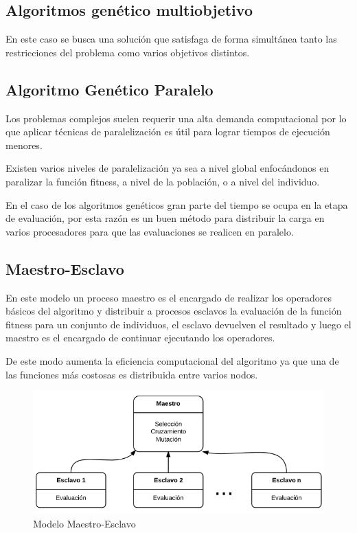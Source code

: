 \subsection{Algoritmos genético multiobjetivo}

En este caso se busca una solución que satisfaga de forma simultánea tanto las restricciones del problema como varios objetivos distintos.



\subsection{Algoritmo Genético Paralelo}
Los problemas complejos suelen requerir una alta demanda computacional por lo que aplicar técnicas de paralelización es útil para lograr tiempos de ejecución menores.

Existen varios niveles de paralelización ya sea a nivel global enfocándonos en paralizar la función fitness, a nivel de la población, o a nivel del individuo. \citep{Nesmachnow2002}

En el caso de los algoritmos genéticos gran parte del tiempo se ocupa en la etapa de evaluación, por esta razón es un buen método para distribuir la carga en varios procesadores para que las evaluaciones se realicen en paralelo.


\subsection{Maestro-Esclavo}

En este modelo un proceso maestro es el encargado de realizar los operadores básicos del algoritmo y distribuir a procesos esclavos la evaluación de la función fitness para un conjunto de individuos, el esclavo devuelven el resultado y luego el maestro es el encargado de continuar ejecutando los operadores.

De este modo aumenta la eficiencia computacional del algoritmo ya que una de las funciones más costosas es distribuida entre varios nodos.

\begin{figure}[H]
	\centering
	\includegraphics[width=0.7\linewidth]{Figures/diagrama-master-slave}
	\caption[Modelo Maestro-Esclavo]{Modelo Maestro-Esclavo}
	\label{fig:diagrama-master-slave}
\end{figure}

